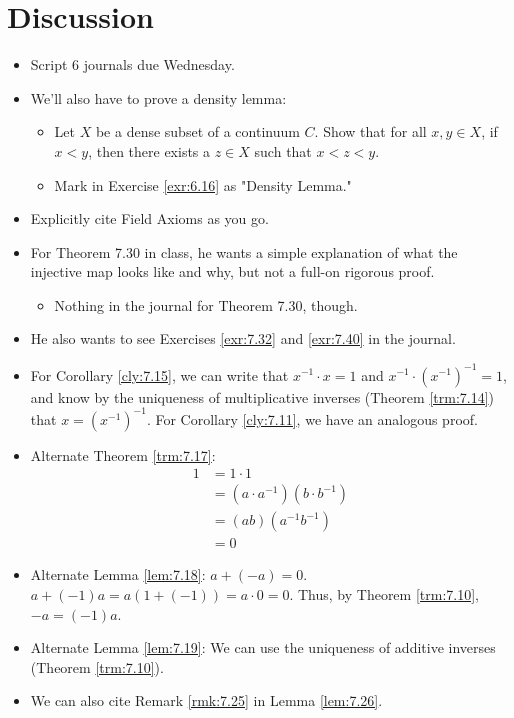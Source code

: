 \documentclass{report}
\begin{document}
\section{Discussion}
\begin{itemize}
    \item {}Script 6 journals due Wednesday.
    \item We'll also have to prove a density lemma:
    \begin{itemize}
        \item Let $X$ be a dense subset of a continuum $C$. Show that for all $x,y\in X$, if $x<y$, then there exists a $z\in X$ such that $x<z<y$.
        \item Mark in Exercise \ref{exr:6.16} as "Density Lemma."
    \end{itemize}
    \item Explicitly cite Field Axioms as you go.
    \item {}For Theorem 7.30 in class, he wants a simple explanation of what the injective map looks like and why, but not a full-on rigorous proof.
    \begin{itemize}
        \item Nothing in the journal for Theorem 7.30, though.
    \end{itemize}
    \item He also wants to see Exercises \ref{exr:7.32} and \ref{exr:7.40} in the journal.
    \item For Corollary \ref{cly:7.15}, we can write that $x^{-1}\cdot x=1$ and $x^{-1}\cdot(x^{-1})^{-1}=1$, and know by the uniqueness of multiplicative inverses (Theorem \ref{trm:7.14}) that $x=(x^{-1})^{-1}$. For Corollary \ref{cly:7.11}, we have an analogous proof.
    \item Alternate Theorem \ref{trm:7.17}:
    \begin{align*}
        1 &= 1\cdot 1\\
        &= (a\cdot a^{-1})(b\cdot b^{-1})\\
        &= (ab)(a^{-1}b^{-1})\\
        &= 0
    \end{align*}
    \item Alternate Lemma \ref{lem:7.18}: $a+(-a)=0$. $a+(-1)a=a(1+(-1))=a\cdot 0=0$. Thus, by Theorem \ref{trm:7.10}, $-a=(-1)a$.
    \item Alternate Lemma \ref{lem:7.19}: We can use the uniqueness of additive inverses (Theorem \ref{trm:7.10}).
    \item We can also cite Remark \ref{rmk:7.25} in Lemma \ref{lem:7.26}.

\end{itemize}
\end{document}
